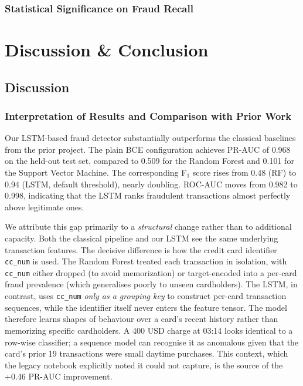 \documentclass[oneside,12pt,parskip=half,american,numbers=noenddot]{scrreprt}
\begin{document}
\subsection{Statistical Significance on Fraud Recall}
\label{statistical_significance}


\pagebreak
\chapter{Discussion \& Conclusion}

\section{Discussion}

\subsection{Interpretation of Results and Comparison with Prior Work}

Our LSTM-based fraud detector substantially outperforms the classical 
baselines from the prior project. The plain BCE configuration achieves 
PR-AUC of 0.968 on the held-out test set, compared to 0.509 for the 
Random Forest and 0.101 for the Support Vector Machine. The 
corresponding F$_1$ score rises from 0.48 (RF) to 0.94 (LSTM, default 
threshold), nearly doubling. ROC-AUC moves from 0.982 to 0.998, 
indicating that the LSTM ranks fraudulent transactions almost perfectly 
above legitimate ones.

We attribute this gap primarily to a \emph{structural} change rather 
than to additional capacity. Both the classical pipeline and our LSTM 
see the same underlying transaction features. The decisive difference 
is how the credit card identifier \texttt{cc\_num} is used. The Random 
Forest treated each transaction in isolation, with \texttt{cc\_num} 
either dropped (to avoid memorization) or target-encoded into a 
per-card fraud prevalence (which generalises poorly to unseen 
cardholders). The LSTM, in contrast, uses \texttt{cc\_num} 
\emph{only as a grouping key} to construct per-card transaction 
sequences, while the identifier itself never enters the feature tensor. 
The model therefore learns shapes of behaviour over a card's recent 
history rather than memorizing specific cardholders. A 400 USD charge 
at 03:14 looks identical to a row-wise classifier; a sequence model 
can recognise it as anomalous given that the card's prior 19 
transactions were small daytime purchases. This context, which the 
legacy notebook explicitly noted it could not capture, is the source 
of the +0.46 PR-AUC improvement.
\end{document}
